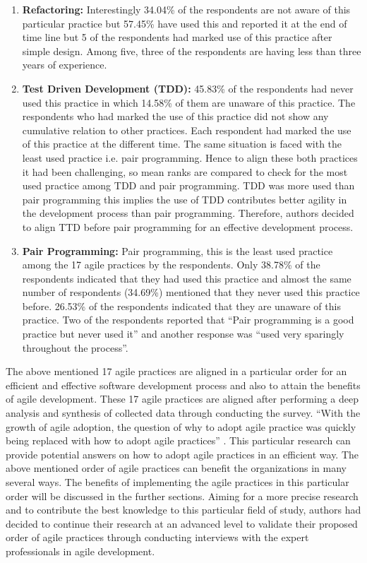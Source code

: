 \documentclass[a4paper,oneside]{bth}
\begin{document}
\begin{enumerate}
\item \textbf{Refactoring:} Interestingly 34.04\% of the respondents are not aware of this particular practice but 57.45\% have used this and reported it at the end of time line but 5 of the respondents had marked use of this practice after simple design. Among five, three of the respondents are having less than three years of experience.
\item \textbf{Test Driven Development (TDD):} 45.83\% of the respondents had never used this practice in which 14.58\% of them are unaware of this practice. The respondents who had marked the use of this practice did not show any cumulative relation to other practices. Each respondent had marked the use of this practice at the different time. The same situation is faced with the least used practice i.e. pair programming. Hence to align these both practices it had been challenging, so mean ranks are compared to check for the most used practice among TDD and pair programming. TDD was more used than pair programming this implies the use of TDD contributes better agility in the development process than pair programming. Therefore, authors decided to align TTD before pair programming for an effective development process.
\item \textbf{Pair Programming:} Pair programming, this is the least used practice among the 17 agile practices by the respondents. Only 38.78\% of the respondents indicated that they had used this practice and almost the same number of respondents (34.69\%) mentioned that they never used this practice before. 26.53\% of the respondents indicated that they are unaware of this practice. Two of the respondents reported that “Pair programming is a good practice but never used it” and another response was “used very sparingly throughout the process”.
\end{enumerate}

The above mentioned 17 agile practices are aligned in a particular order for an efficient and effective software development process and also to attain the benefits of agile development. These 17 agile practices are aligned after performing a deep analysis and synthesis of collected data through conducting the survey. “With the growth of agile adoption, the question of why to adopt agile practice was quickly being replaced with how to adopt agile practices” \cite{sidky_structured_2007}. This particular research can provide potential answers on how to adopt agile practices in an efficient way. The above mentioned order of agile practices can benefit the organizations in many several ways. The benefits of implementing the agile practices in this particular order will be discussed in the further sections. Aiming for a more precise research and to contribute the best knowledge to this particular field of study, authors had decided to continue their research at an advanced level to validate their proposed order of agile practices through conducting interviews with the expert professionals in agile development.
\end{document}
